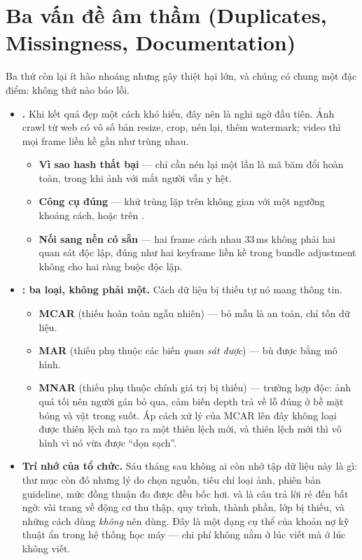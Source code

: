 \documentclass[../../deep_learning.tex]{subfiles}
\begin{document}
\section{Ba vấn đề âm thầm (Duplicates, Missingness, Documentation)}
Ba thứ còn lại ít hào nhoáng nhưng gây thiệt hại lớn, và chúng có chung một đặc điểm: không thứ nào báo lỗi.

\begin{itemize}
\item \textbf{.} Khi kết quả đẹp một cách khó hiểu, đây nên là nghi ngờ đầu tiên. Ảnh crawl từ web có vô số bản resize, crop, nén lại, thêm watermark; video thì mọi frame liền kề gần như trùng nhau.
  \begin{itemize}
  \item \textbf{Vì sao hash thất bại} --- chỉ cần nén lại một lần là mã băm đổi hoàn toàn, trong khi ảnh với mắt người vẫn y hệt.
  \item \textbf{Công cụ đúng} --- khử trùng lặp trên không gian  với một ngưỡng khoảng cách, hoặc trên .
  \item \textbf{Nối sang nền có sẵn} --- hai frame cách nhau 33\,ms không phải hai quan sát độc lập, đúng như hai keyframe liền kề trong bundle adjustment không cho hai ràng buộc độc lập.
  \end{itemize}
\item \textbf{: ba loại, không phải một.} Cách dữ liệu bị thiếu tự nó mang thông tin.
  \begin{itemize}
  \item \textbf{MCAR} (thiếu hoàn toàn ngẫu nhiên) --- bỏ mẫu là an toàn, chỉ tốn dữ liệu.
  \item \textbf{MAR} (thiếu phụ thuộc các biến \emph{quan sát được}) --- bù được bằng mô hình.
  \item \textbf{MNAR} (thiếu phụ thuộc chính giá trị bị thiếu) --- trường hợp độc: ảnh quá tối nên người gán bỏ qua, cảm biến depth trả về lỗ đúng ở bề mặt bóng và vật trong suốt. Áp cách xử lý của MCAR lên đây không loại được thiên lệch mà tạo ra một thiên lệch mới, và thiên lệch mới thì vô hình vì nó vừa được ``dọn sạch''.
  \end{itemize}
\item \textbf{Trí nhớ của tổ chức.} Sáu tháng sau không ai còn nhớ tập dữ liệu này là gì: thư mục còn đó nhưng lý do chọn nguồn, tiêu chí loại ảnh, phiên bản guideline, mức đồng thuận đo được đều bốc hơi.  \cite{gebru2021datasheets} và  \cite{mitchell2019model} là câu trả lời rẻ đến bất ngờ: vài trang về động cơ thu thập, quy trình, thành phần, lớp bị thiếu, và những cách dùng \emph{không} nên dùng. Đây là một dạng cụ thể của khoản nợ kỹ thuật ẩn trong hệ thống học máy \cite{sculley2015hidden} --- chi phí không nằm ở lúc viết mà ở lúc không viết.
\end{itemize}
\end{document}
